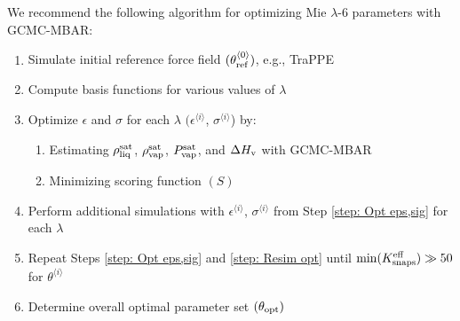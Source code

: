 \documentclass[journal=jced,manuscript=article]{achemso}
\begin{document}
We recommend the following algorithm for optimizing Mie $\lambda$-6 parameters with GCMC-MBAR:
\begin{enumerate}
	\item Simulate initial reference force field $(\theta^{\langle0\rangle}_{\rm ref})$, e.g., TraPPE \label{step: Sim ref}
	\item Compute basis functions for various values of $\lambda$ \label{step: Basis Functions}
    \item Optimize $\epsilon$ and $\sigma$ for each $\lambda$ $(\epsilon^{\langle i \rangle}$, $\sigma^{\langle i \rangle}$) by: \label{step: Opt eps,sig}
	\begin{enumerate}
		\item Estimating $\rho_{\rm liq}^{\rm sat}$, $\rho_{\rm vap}^{\rm sat}$, $P_{\rm vap}^{\rm sat}$, and $\Delta H_{\rm v}$ with GCMC-MBAR
		\item Minimizing scoring function $(S)$
	\end{enumerate}
	\item Perform additional simulations with $\epsilon^{\langle i \rangle}$, $\sigma^{\langle i \rangle}$ from Step \ref{step: Opt eps,sig} for each $\lambda$ \label{step: Resim opt}
	\item Repeat Steps \ref{step: Opt eps,sig} and \ref{step: Resim opt} until $\min(K_{\rm snaps}^{\rm eff}) \gg 50$ for $\theta^{\langle i \rangle}$
	\item Determine overall optimal parameter set $(\theta_{\rm opt})$ \label{step: Opt eps,sig,lam}
\end{enumerate}
\end{document}

